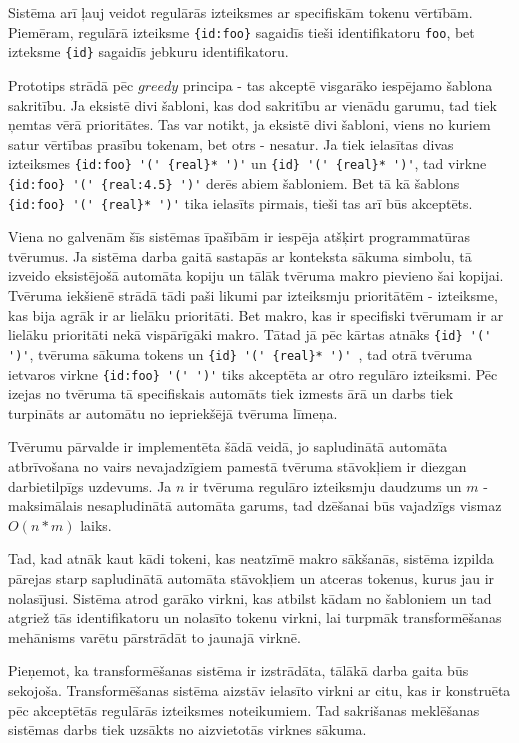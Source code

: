 Sistēma arī ļauj veidot regulārās izteiksmes ar specifiskām tokenu vērtībām. Piemēram, regulārā izteiksme \verb|{id:foo}| sagaidīs tieši identifikatoru \verb|foo|, bet izteksme \verb|{id}| sagaidīs jebkuru identifikatoru.

Prototips strādā pēc $greedy$ principa - tas akceptē visgarāko iespējamo šablona sakritību. Ja eksistē divi šabloni, kas dod sakritību ar vienādu garumu, tad tiek ņemtas vērā prioritātes. Tas var notikt, ja eksistē divi šabloni, viens no kuriem satur vērtības prasību tokenam, bet otrs - nesatur. Ja tiek ielasītas divas izteiksmes  \verb|{id:foo} '(' {real}* ')'| un \verb|{id} '(' {real}* ')'|, tad virkne \verb|{id:foo} '(' {real:4.5} ')'| derēs abiem šabloniem. Bet tā kā šablons \\ \verb|{id:foo} '(' {real}* ')'| tika ielasīts pirmais, tieši tas arī būs akceptēts.

Viena no galvenām šīs sistēmas īpašībām ir iespēja atšķirt programmatūras tvērumus. Ja sistēma darba gaitā sastapās ar konteksta sākuma simbolu, tā izveido eksistējošā automāta kopiju un tālāk tvēruma makro pievieno šai kopijai. Tvēruma iekšienē strādā tādi paši likumi par izteiksmju prioritātēm - izteiksme, kas bija agrāk ir ar lielāku prioritāti. Bet makro, kas ir specifiski tvērumam ir ar lielāku prioritāti nekā vispārīgāki makro. Tātad jā pēc kārtas atnāks \verb|{id} '(' ')'|, tvēruma sākuma tokens un \verb|{id} '(' {real}* ')' |, tad otrā tvēruma ietvaros virkne \verb|{id:foo} '(' ')'| tiks akceptēta ar otro regulāro izteiksmi. Pēc izejas no tvēruma tā specifiskais automāts tiek izmests ārā un darbs tiek turpināts ar automātu no iepriekšējā tvēruma līmeņa.

Tvērumu pārvalde ir implementēta šādā veidā, jo sapludinātā automāta atbrīvošana no vairs nevajadzīgiem pamestā tvēruma stāvokļiem ir diezgan darbietilpīgs uzdevums. Ja $n$ ir tvēruma regulāro izteiksmju daudzums un $m$ - maksimālais nesapludinātā automāta garums, tad dzēšanai būs vajadzīgs vismaz $O(n*m)$ laiks. 

Tad, kad atnāk kaut kādi tokeni, kas neatzīmē makro sākšanās, sistēma izpilda pārejas starp sapludinātā automāta stāvokļiem un atceras tokenus, kurus jau ir nolasījusi. Sistēma atrod garāko virkni, kas atbilst kādam no šabloniem un tad atgriež tās identifikatoru un nolasīto tokenu virkni, lai turpmāk transformēšanas mehānisms varētu pārstrādāt to jaunajā virknē.

Pieņemot, ka transformēšanas sistēma ir izstrādāta, tālākā darba gaita būs sekojoša. Transformēšanas sistēma aizstāv ielasīto virkni ar citu, kas ir konstruēta pēc akceptētās regulārās izteiksmes noteikumiem. Tad sakrišanas meklēšanas sistēmas darbs tiek uzsākts no aizvietotās virknes sākuma.

